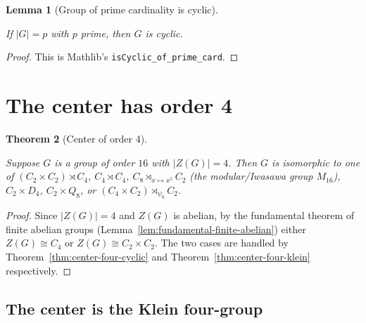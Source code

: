 \documentclass{article}
\newtheorem{theorem}{Theorem}[section]
\newtheorem{lemma}[theorem]{Lemma}
\theoremstyle{definition}
\newcommand{\lean}[1]{}
\newcommand{\leanok}{}
\newcommand{\leanfile}[1]{}
\newcommand{\uses}[1]{}
\begin{document}
\begin{lemma}[Group of prime cardinality is cyclic]
    \label{lem:cyclic-of-prime-card}
    \lean{OrderSixteen.Prelim.cyclic_of_prime_card}
    \leanfile{M2rGroup7/SixteenCase.lean}
    \leanok
    If $|G| = p$ with $p$ prime, then $G$ is cyclic.
\end{lemma}
\begin{proof}
    This is Mathlib's \texttt{isCyclic\_of\_prime\_card}.
\end{proof}

\section{The center has order 4}

\begin{theorem}[Center of order 4]
    \label{thm:center-four}
    \uses{thm:center-four-klein,thm:center-four-cyclic,
          lem:quotient-by-center-card,lem:two-power-divisors,
          lem:fundamental-finite-abelian}
    Suppose $G$ is a group of order $16$ with $|Z(G)| = 4$. Then $G$ is
    isomorphic to one of $(C_2 \times C_2) \rtimes C_4$,
    $C_4 \rtimes C_4$, $C_8 \rtimes_{x \mapsto x^5} C_2$
    (the modular/Iwasawa group $M_{16}$), $C_2 \times D_4$,
    $C_2 \times Q_8$, or $(C_4 \times C_2) \rtimes_{\psi_6} C_2$.
\end{theorem}
\begin{proof}
    \uses{thm:center-four-klein,thm:center-four-cyclic,
          lem:fundamental-finite-abelian}
    Since $|Z(G)| = 4$ and $Z(G)$ is abelian, by the fundamental theorem of
    finite abelian groups (Lemma~\ref{lem:fundamental-finite-abelian}) either
    $Z(G) \cong C_4$ or $Z(G) \cong C_2 \times C_2$. The two cases are
    handled by Theorem~\ref{thm:center-four-cyclic} and
    Theorem~\ref{thm:center-four-klein} respectively.
\end{proof}

\subsection{The center is the Klein four-group}
\end{document}
